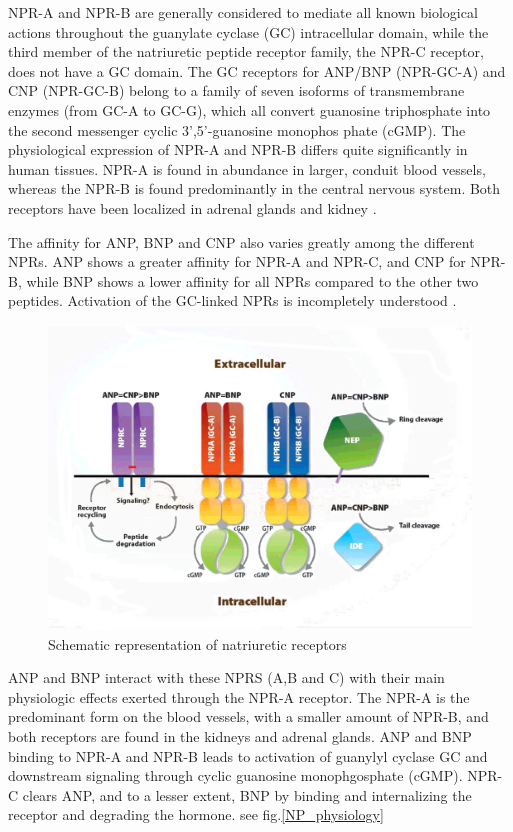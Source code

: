 \documentclass[14pt,a4paper,onecolumn]{extarticle}
\begin{document}
NPR-A and NPR-B are generally considered to mediate all known biological actions throughout the guanylate cyclase (GC) intracellular domain, while the third member of the natriuretic peptide receptor family, the NPR-C receptor, does not have a GC domain.  The GC receptors for ANP/BNP (NPR-GC-A) and CNP (NPR-GC-B) belong to a family of seven isoforms of transmembrane enzymes (from GC-A to GC-G), which all convert guanosine triphosphate into the second messenger cyclic 3’,5’-guanosine monophos phate (cGMP).  The physiological expression of NPR-A and NPR-B differs quite significantly in human tissues. NPR-A is found in abundance in larger, conduit blood vessels, whereas the NPR-B is found predominantly in the central nervous system. Both receptors have been localized in adrenal glands and kidney \citep{bib355}.

The affinity for ANP, BNP and CNP also varies greatly among the different NPRs.  ANP shows a greater affinity for NPR-A and NPR-C, and CNP for NPR-B, while BNP shows a lower affinity for all NPRs compared to the other two peptides.  Activation of the GC-linked NPRs is incompletely understood \citep{172}.

\begin{figure}      \centering      \includegraphics[scale=1]{../../images/NP_receptors.jpg}     \small\caption{Schematic representation of natriuretic receptors}      \label{NP_receptors}  \end{figure}

ANP and BNP interact with these NPRS (A,B and C)  with their main physiologic effects exerted through the NPR-A receptor.  The NPR-A is the predominant form on the blood vessels, with a smaller amount of NPR-B, and both receptors are found in the kidneys and adrenal glands.  ANP and BNP binding to NPR-A and NPR-B leads to activation of guanylyl cyclase GC and downstream signaling through cyclic guanosine monophgosphate (cGMP).  NPR-C clears ANP, and to a lesser extent, BNP by binding and internalizing the receptor and degrading the hormone. see fig.\ref{NP_physiology} \citep{Maisel2018}
\end{document}
